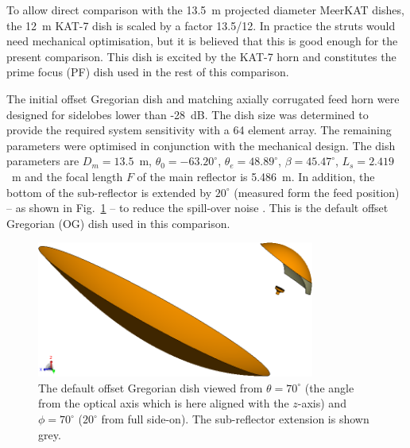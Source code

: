 \documentclass{aa}
\begin{document}
To allow direct comparison with the 13.5~m projected diameter MeerKAT dishes,
the 12~m KAT-7 dish is scaled by a factor 13.5/12.  In practice the struts would
need mechanical optimisation, but it is believed that this is good enough for
the present comparison.  This dish is excited by the KAT-7 horn and constitutes
the prime focus (PF) dish used in the rest of this comparison.

The initial offset Gregorian dish and matching axially corrugated feed horn were
designed for sidelobes lower than -28~dB.  The dish size was determined to
provide the required system sensitivity with a 64 element array.  The remaining
parameters were optimised in conjunction with the mechanical design.  The dish
parameters \citep[as defined in][]{granet-parameters} are $D_m = 13.5$~m,
$\theta_0 = -63.20^\circ$, $\theta_e = 48.89^\circ$, $\beta = 45.47^\circ$, $L_s
= 2.419$~m and the focal length $F$ of the main reflector is 5.486~m.  In
addition, the bottom of the sub-reflector is extended by $20^\circ$ (measured
form the feed position) -- as shown in Fig.~\ref{fig:TU3e20:optics} -- to reduce the
spill-over noise \citep{icea-dish-design}.  This is the default offset Gregorian
(OG) dish used in this comparison.

\begin{figure}
\centering \includegraphics[width=258.48pt]{TU3e20-optics}
\caption{\label{fig:TU3e20:optics}The default offset Gregorian dish viewed from 
  $\theta=70^\circ$ (the angle from the optical axis which is here aligned with the 
  $z$-axis) and  $\phi=70^\circ$ ($20^\circ$ from full side-on).
  The sub-reflector extension is shown grey.}
\end{figure}
\end{document}
